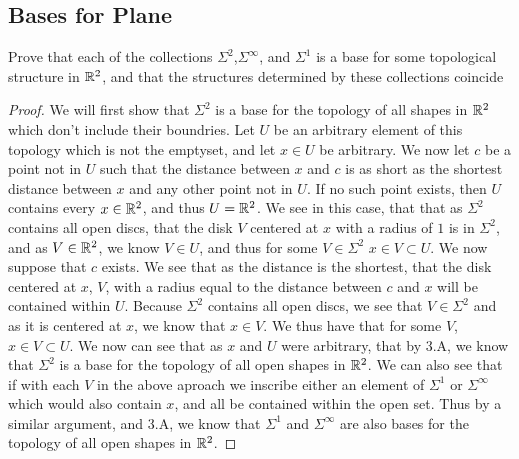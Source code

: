 \subsection{Bases for Plane}

\begin{minorEx}%
  Prove that each of the collections $\Sigma^2$,$\Sigma^\infty$, and
  $\Sigma^1$ is a base for some topological structure in $\mathbb{R}^2$, and
  that the structures determined by these collections coincide
\end{minorEx}
\begin{proof}
  We will first show that $\Sigma^2$ is a base for the topology of all
  shapes in $\mathbb{R}^2$ which don't include their boundries. Let $U$ be an
  arbitrary element of this topology which is not the emptyset, and
  let $x\in U$ be arbitrary. We now let $c$ be a point not in $U$ such
  that the distance between $x$ and $c$ is as short as the shortest
  distance between $x$ and any other point not in $U$. If no such
  point exists, then $U$ contains every $x\in\mathbb{R}^2$, and thus $U =
  \mathbb{R}^2$. We see in this case, that that as $\Sigma^2$ contains all open
  discs, that the disk $V$ centered at $x$ with a radius of $1$ is in
  $\Sigma^2$, and as $V\in \mathbb{R}^2$, we know $V \in U$, and thus for
  some $V\in \Sigma^2$  $x\in V \subset U$. We now suppose that $c$
  exists. We see that as the distance is the shortest, that the disk
  centered at $x$, $V$, with a radius equal to the distance between $c$ and
  $x$ will be contained within $U$. Because $\Sigma^2$ contains all open
  discs, we see that $V\in\Sigma^2$ and as it is centered at $x$, we
  know that $x \in V$. We thus have that for some $V$, $x\in V \subset
  U$. We now can see that as $x$ and $U$ were arbitrary, that by 3.A,
  we know that $\Sigma^2$ is a base for the topology of all open
  shapes in $\mathbb{R}^2$. We can also see that if with each $V$ in the
  above aproach we inscribe either an element of $\Sigma^1$ or
  $\Sigma^\infty$ which would also contain $x$, and all be contained
  within the open set. Thus by a similar argument, and 3.A, we know
  that $\Sigma^1$ and $\Sigma^\infty$ are also bases for the topology of all open
  shapes in $\mathbb{R}^2$.

\end{proof}